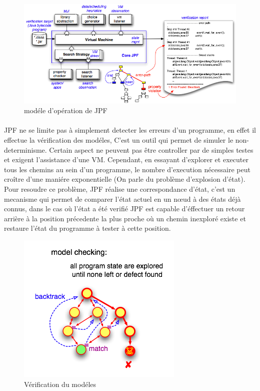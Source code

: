 			\begin{figure}[H]
				\centering
					\includegraphics[scale=0.5]{images/jpf-model.png}
				\caption{modéle d'opération de \gls{JPF}}
			\end{figure}
	
			\paragraph{}
				\gls{JPF} ne se limite pas à simplement detecter les erreurs d'un programme, en effet il effectue la vérification des modéles,
				C'est un outil qui permet de simuler le non-determinisme. Certain aspect ne peuvent pas être controller par de simples testes
				et exigent l'assistance d'une \gls{VM}.
				Cependant, en essayant d'explorer et executer tous les chemins au sein d'un programme, le nombre d'execution nécessaire peut
				croître d'une maniére exponentielle (On parle du problème d'explosion d'état). Pour resoudre ce problème, \gls{JPF} réalise une
				correspondance d'état, c'est un mecanisme qui permet de comparer l'état actuel en un n\oe{}ud à des états déjà connus, dans le cas où l'état
				a été verifié \gls{JPF} est capable d'éffectuer un retour arrière à la position précedente la plus proche où un chemin inexploré existe et 
				restaure l'état du programme à tester à cette position.
	
			\begin{figure}[H]
				\centering
					\includegraphics[scale=0.5]{images/jpf-model-checking.png}
				\caption{Vérification du modéles}
			\end{figure}
      
